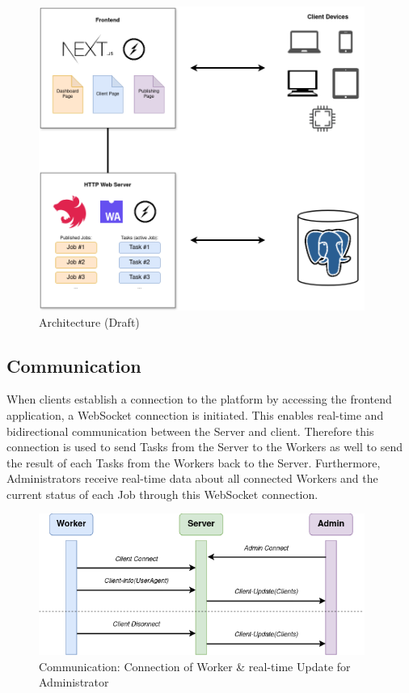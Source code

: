 \begin{figure}[htbp]
    \centering
    \includegraphics[width=0.95\textwidth]{gfx/figures/WebAssembly-MA.png}
    \caption{Architecture (Draft)}
    \label{fig:implementation:architecture}
\end{figure}

\subsection{Communication}
\label{subsec:implementation:architecture:communication}
When clients establish a connection to the platform by accessing the frontend application, a WebSocket connection is initiated. This enables real-time and bidirectional communication between the Server and client. Therefore this connection is used to send Tasks from the Server to the Workers as well to send the result of each Tasks from the Workers back to the Server. Furthermore, Administrators receive real-time data about all connected Workers and the current status of each Job through this WebSocket connection.

\begin{figure}[htbp]
    \centering
    \includegraphics[width=0.95\textwidth]{gfx/figures/communication-connection.png}
    \caption{Communication: Connection of Worker \& real-time Update for Administrator}
    \label{fig:implementation:communication1}
\end{figure}

